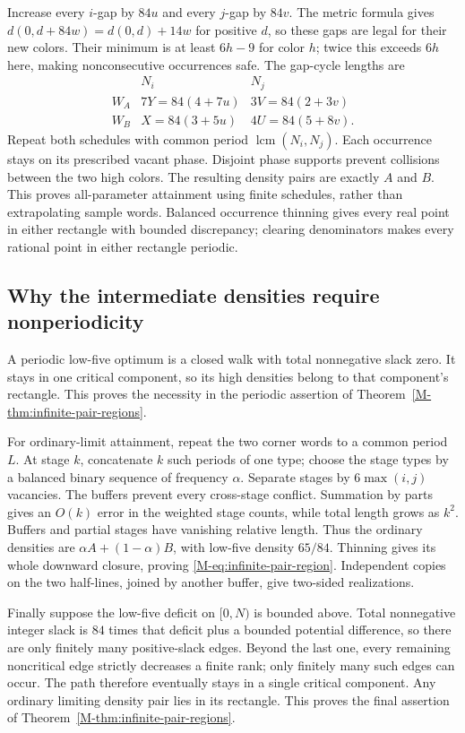 \documentclass[11pt,reqno]{amsart}
\theoremstyle{plain}
\theoremstyle{plain}
\theoremstyle{plain}
\begin{document}
Increase every $i$-gap by $84u$ and every $j$-gap by $84v$. The metric
formula gives $d(0,d+84w)=d(0,d)+14w$ for positive $d$, so these gaps
are legal for their new colors. Their minimum is at least $6h-9$ for
color $h$; twice this exceeds $6h$ here, making nonconsecutive
occurrences safe. The gap-cycle lengths are
\[
 \begin{array}{c|cc}
  &N_i&N_j\\ \hline
  W_A&7Y=84(4+7u)&3V=84(2+3v)\\
  W_B&X=84(3+5u)&4U=84(5+8v).
 \end{array}
\]
Repeat both schedules with common period $\operatorname{lcm}(N_i,N_j)$.
Each occurrence stays on its prescribed vacant phase. Disjoint phase
supports prevent collisions between the two high colors. The resulting
density pairs are exactly $A$ and $B$. This proves all-parameter
attainment using finite schedules, rather than extrapolating sample words.
Balanced occurrence thinning gives every real point in either rectangle
with bounded discrepancy; clearing denominators makes every rational
point in either rectangle periodic.

\subsection{Why the intermediate densities require nonperiodicity}

A periodic low-five optimum is a closed walk with total nonnegative
slack zero. It stays in one critical component, so its high densities
belong to that component's rectangle. This proves the necessity in the
periodic assertion of Theorem~\ref{M-thm:infinite-pair-regions}.

For ordinary-limit attainment, repeat the two corner words to a common
period $L$. At stage $k$, concatenate $k$ such periods of one type;
choose the stage types by a balanced binary sequence of frequency
$\alpha$. Separate stages by $6\max(i,j)$ vacancies. The buffers
prevent every cross-stage conflict. Summation by parts gives an $O(k)$
error in the weighted stage counts, while total length grows as $k^2$.
Buffers and partial stages have vanishing relative length. Thus the
ordinary densities are $\alpha A+(1-\alpha)B$, with low-five density
$65/84$. Thinning gives its whole downward closure, proving
\eqref{M-eq:infinite-pair-region}. Independent copies on the two
half-lines, joined by another buffer, give two-sided realizations.

Finally suppose the low-five deficit on $[0,N)$ is bounded above.
Total nonnegative integer slack is $84$ times that deficit plus a
bounded potential difference, so there are only finitely many
positive-slack edges. Beyond the last one, every remaining noncritical
edge strictly decreases a finite rank; only finitely many such edges
can occur. The path therefore eventually stays in a single critical
component. Any ordinary limiting density pair lies in its rectangle.
This proves the final assertion of
Theorem~\ref{M-thm:infinite-pair-regions}.
\end{document}
